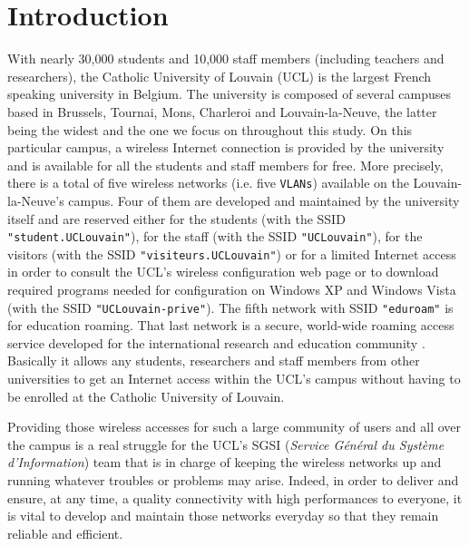 
\chapter{Introduction} %

\label{Chapter1} %


With nearly 30,000 students and 10,000 staff members (including teachers and researchers), the Catholic University of Louvain (UCL) is the largest French speaking university in Belgium. The university is composed of several campuses based in Brussels, Tournai, Mons, Charleroi and Louvain-la-Neuve, the latter being the widest and the one we focus on throughout this study. On this particular campus, a wireless Internet connection is provided by the university and is available for all the students and staff members for free. More precisely, there is a total of five wireless networks (i.e. five \texttt{VLANs}) available on the Louvain-la-Neuve's campus. Four of them are developed and maintained by the university itself and are reserved either for the students (with the SSID \texttt{"student.UCLouvain"}), for the staff (with the SSID \texttt{"UCLouvain"}), for the visitors (with the SSID \texttt{"visiteurs.UCLouvain"}) or for a limited Internet access in order to consult the UCL's wireless configuration web page or to download required programs needed for configuration on Windows XP and Windows Vista (with the SSID \texttt{"UCLouvain-prive"}). The fifth network with SSID \texttt{"eduroam"} is for education roaming. That last network is a secure, world-wide roaming access service developed for the international research and education community \cite{eduroam1}. Basically it allows any students, researchers and staff members from other universities to get an Internet access within the UCL's campus without having to be enrolled at the Catholic University of Louvain.

Providing those wireless accesses for such a large community of users and all over the campus is a real struggle for the UCL's SGSI (\textit{Service Général du Système d'Information}) team that is in charge of keeping the wireless networks up and running whatever troubles or problems may arise. Indeed, in order to deliver and ensure, at any time, a quality connectivity with high performances to everyone, it is vital to develop and maintain those networks everyday so that they remain reliable and efficient.
 
